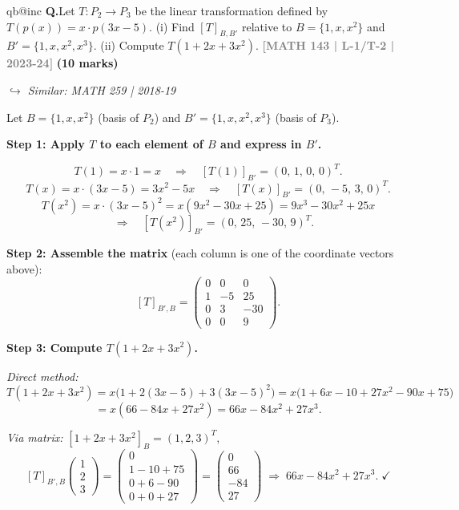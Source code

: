 \documentclass[12pt,a3paper]{article}
\makeatletter
\newcommand{\yr}[1]{\hfill\textcolor{gray}{\small\textbf{[#1]}}}
\newcommand{\mk}[1]{\textcolor{orange!70!black}{\small\textbf{(#1 marks)}}}
\newcommand{\variant}[1]{\par\vspace{1pt}\textcolor{blue!50!black}%
  {\footnotesize\textit{$\hookrightarrow$ Similar: #1}}}
\newcounter{qnum}
\newcommand{\Q}[1]{%
  \csname qb@inc\endcsname
  \needspace{4\baselineskip}
  \refstepcounter{qnum}
  \vspace{6pt}
  \noindent\textbf{Q\theqnum.}\enspace #1\par
}
\makeatother
\begin{document}
\Q{Let $T: P_2 \to P_3$ be the linear transformation defined by $T(p(x)) = x \cdot p(3x-5)$. (i) Find $[T]_{B,B'}$ relative to $B = \{1, x, x^2\}$ and $B' = \{1, x, x^2, x^3\}$. (ii) Compute $T(1 + 2x + 3x^2)$.
\yr{MATH 143 | L-1/T-2 | 2023-24} \mk{10}
\variant{MATH 259 | 2018-19}}


\begin{tcolorbox}[enhanced,breakable,
  colback=cF!4,colframe=cF,boxrule=0.8pt,arc=5pt,
  title={\textbf{Answer --- $T:P_2\to P_3$, $T(p(x))=x\cdot p(3x-5)$; Matrix \& Computation}},
  fonttitle=\bfseries\color{white},colbacktitle=cF]

Let $B=\{1,x,x^2\}$ (basis of $P_2$) and $B'=\{1,x,x^2,x^3\}$ (basis of $P_3$).

\medskip\textbf{Step 1: Apply $T$ to each element of $B$ and express in $B'$.}

\[
T(1)=x\cdot 1=x \quad\Rightarrow\quad [T(1)]_{B'}=(0,\,1,\,0,\,0)^T.
\]
\[
T(x)=x\cdot(3x-5)=3x^2-5x \quad\Rightarrow\quad [T(x)]_{B'}=(0,\,-5,\,3,\,0)^T.
\]
\[
T(x^2)=x\cdot(3x-5)^2=x(9x^2-30x+25)=9x^3-30x^2+25x 
\]
\[
\quad\Rightarrow\quad [T(x^2)]_{B'}=(0,\,25,\,-30,\,9)^T.
\]

\textbf{Step 2: Assemble the matrix} (each column is one of the coordinate vectors above):
\[
[T]_{B',B}=\begin{pmatrix}0&0&0\\1&-5&25\\0&3&-30\\0&0&9\end{pmatrix}.
\]

\textbf{Step 3: Compute $T(1+2x+3x^2)$.}

\textit{Direct method:}
\[
T(1+2x+3x^2)=x\bigl(1+2(3x-5)+3(3x-5)^2\bigr)
=x\bigl(1+6x-10+27x^2-90x+75\bigr)
\]
\[
=x(66-84x+27x^2)
=\boxed{66x-84x^2+27x^3}.
\]

\textit{Via matrix:} $[1+2x+3x^2]_B=(1,2,3)^T$,
\[
[T]_{B',B}\begin{pmatrix}1\\2\\3\end{pmatrix}
=\begin{pmatrix}0\\1-10+75\\0+6-90\\0+0+27\end{pmatrix}
=\begin{pmatrix}0\\66\\-84\\27\end{pmatrix}
\;\Rightarrow\; 66x-84x^2+27x^3.\;\checkmark
\]


\end{tcolorbox}
\end{document}
